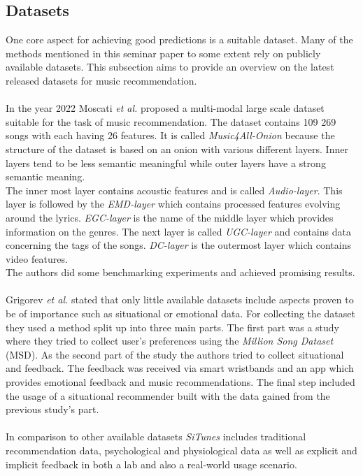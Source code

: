 \documentclass[runningheads,a4paper]{llncs}
\begin{document}
\subsection{Datasets}
One core aspect for achieving good predictions is a suitable dataset. Many of the methods mentioned in this seminar paper to some extent rely on publicly available datasets.
This subsection aims to provide an overview on the latest released datasets for music recommendation. \\
\\
In the year 2022 Moscati \textit{et al.} proposed a multi-modal large scale dataset suitable for the task of music recommendation. 
The dataset contains 109 269 songs with each having 26 features. It is called \textit{Music4All-Onion} because the structure of the dataset is based on an onion with various different layers.
Inner layers tend to be less semantic meaningful while outer layers have a strong semantic meaning. \\
The inner most layer contains acoustic features and is called \textit{Audio-layer}.
This layer is followed by the \textit{EMD-layer} which contains processed features evolving around the lyrics.
\textit{EGC-layer} is the name of the middle layer which provides information on the genres.
The next layer is called \textit{UGC-layer} and contains data concerning the tags of the songs. 
\textit{DC-layer} is the outermost layer which contains video features.\\
The authors did some benchmarking experiments and achieved promising results.\cite{moscati2022music4all}\\
\\
Grigorev \textit{et al.} stated that only little available datasets include aspects proven to be of importance such as situational or emotional data.
For collecting the dataset they used a method split up into three main parts.
The first part was a study where they tried to collect user's preferences using the \textit{Million Song Dataset} (MSD).
As the second part of the study the authors tried to collect situational and feedback.
The feedback was received via smart wristbands and an app which provides emotional feedback and music recommendations.
The final step included the usage of a situational recommender built with the data gained from the previous study's part. \\
\\
In comparison to other available datasets \textit{SiTunes} includes traditional recommendation data, 
psychological and physiological data as well as explicit and implicit feedback in both a lab and also a real-world usage scenario. \cite{grigorev2024situnes}
\end{document}
